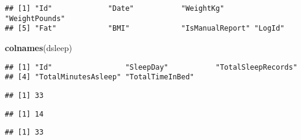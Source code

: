 \documentclass[
]{article}
\newenvironment{Shaded}{\begin{snugshade}}{\end{snugshade}}
\newcommand{\FunctionTok}[1]{\textcolor[rgb]{0.13,0.29,0.53}{\textbf{#1}}}
\newcommand{\NormalTok}[1]{#1}
\newcommand{\SpecialCharTok}[1]{\textcolor[rgb]{0.81,0.36,0.00}{\textbf{#1}}}
\begin{document}
\begin{verbatim}
## [1] "Id"             "Date"           "WeightKg"       "WeightPounds"  
## [5] "Fat"            "BMI"            "IsManualReport" "LogId"
\end{verbatim}

\begin{Shaded}
\begin{Highlighting}[]
\FunctionTok{colnames}\NormalTok{(dsleep)}
\end{Highlighting}
\end{Shaded}

\begin{verbatim}
## [1] "Id"                 "SleepDay"           "TotalSleepRecords" 
## [4] "TotalMinutesAsleep" "TotalTimeInBed"
\end{verbatim}

\begin{Shaded}
\end{Shaded}

\begin{verbatim}
## [1] 33
\end{verbatim}

\begin{Shaded}
\end{Shaded}

\begin{verbatim}
## [1] 14
\end{verbatim}

\begin{Shaded}
\end{Shaded}

\begin{verbatim}
## [1] 33
\end{verbatim}

\begin{Shaded}
\end{Shaded}
\end{document}
